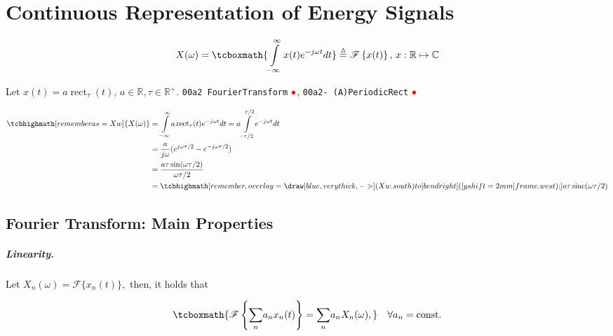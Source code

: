 \documentclass[17pt,a4paper]{extarticle}
\newcommand{\Real}{\mathbb{R}}\newcommand{\N}{\mathbb{N}}
\newcommand{\gc}[1]{\textcolor[rgb]{1.00,0.00,0.00}{#1}}
\newcommand{\alp}[1]{\textcolor[rgb]{0.00,0.00,1.00}{\small\texttt{#1}}}
\begin{document}
\section*{Continuous Representation of Energy Signals} 
\begin{linenomath*}\begin{equation*}
X(\omega)=	\tcboxmath{\displaystyle\int\limits_{-\infty}^{\infty} x(t)e^{-j\omega
	t}dt}\overset{\vartriangle}{=}\mathscr{F}\left\{ x(t)\right\},\, x:\Real \mapsto \mathbb{C}
\end{equation*}
\end{linenomath*}
\begin{example}
Let $x(t){=}a\operatorname{rect}_{\tau}(t)$, $a{\in} \Real, \tau{\in}\Real^{+}$. \alp{00a2 FourierTransform}
\href{https://deepnote.com/workspace/gcpds-76307f69-c109-4b50-8818-29b8600ffe98/project/Fundamentals-ef1064c8-5ffe-4039-a3f4-6f71bb3de118/notebook/00a2%20FourierTransform-394c1ed31b81431690c016c72de4a6a6}{$\gc{\bullet}$},	\alp{00a2- (A)PeriodicRect}
\href{https://deepnote.com/workspace/gcpds-76307f69-c109-4b50-8818-29b8600ffe98/project/Fundamentals-ef1064c8-5ffe-4039-a3f4-6f71bb3de118/notebook/00a2-%20(A)PeriodicRect-cd372a5f709f4858a893e5d4230389db}{$\gc{\bullet}$}
\begin{linenomath*}\begin{align*}
\tcbhighmath[remember as=Xw]{X(\omega)} & ={\displaystyle\int\limits_{-\infty}^{\infty}} a\operatorname{rect}_{\tau}(t)e^{-j\omega
	t}dt =a {\displaystyle\int\limits_{-\tau/2}^{\tau/2}}
e^{-j\omega t}dt\\ &=\frac{a}{j\omega}(e^{j\omega\tau/2}-e^{-j\omega\tau/2})\\
&=\dfrac{a\tau
	\sin(\omega\tau/2)}{\omega\tau/2}\\
 & =
 \tcbhighmath[remember,overlay={%
 	\draw[blue,very thick,->] (Xw.south) to[bend right] ([yshift=2mm]frame.west);}]
 {a\tau\operatorname{sinc}(\omega\tau/2)}
\end{align*}\end{linenomath*}
\end{example} 
\clearpage

\subsection*{Fourier Transform: Main Properties} 
\subparagraph{\textit{Linearity}.} Let $X_{n}(\omega)=\mathscr{F} \{x_{n}(t)\},$ then, it holds that %
\begin{linenomath*}\begin{equation*}
	\tcboxmath{\mathscr{F}\left\{ {\displaystyle\sum\limits_{n}} a_{n}x_{n}(t)\right\}
		={\displaystyle\sum\limits_{n}} a_{n}X_{n}(\omega),}\quad
		\forall a_{n}=\operatorname{const.} 
\end{equation*}\end{linenomath*}
\end{document}
